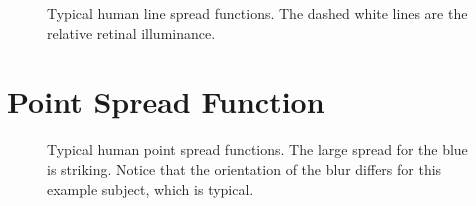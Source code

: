 \documentclass[
  letterpaper,
]{book}
\begin{document}
\begin{figure}


\caption{\label{fig-optics-linespread}Typical human line spread
functions. The dashed white lines are the relative retinal illuminance.}

\end{figure}%

\section{Point Spread Function}

\begin{figure}


\caption{\label{fig-optics-pointspread}Typical human point spread
functions. The large spread for the blue is striking. Notice that the
orientation of the blur differs for this example subject, which is
typical.}

\end{figure}%
\end{document}
